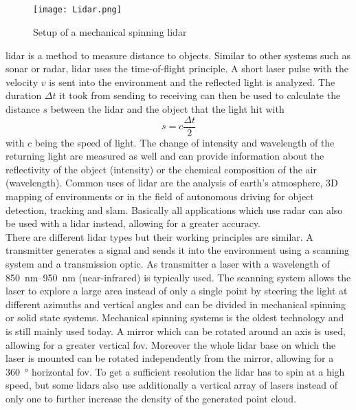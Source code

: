 \subsection{}
\begin{figure}[htb]
	\centering
	\texttt{[image: Lidar.png]}
	\caption{Setup of a mechanical spinning \acrshort{lidar} \cite{Li2020}}
	\label{fig:lidar}
\end{figure}
\gls{lidar} is a method to measure distance to objects.
Similar to other systems such as \gls{sonar} or \gls{radar}, \gls{lidar} uses the time-of-flight principle.
A short laser pulse with the velocity $v$ is sent into the environment and the reflected light is analyzed.
The duration $\Delta t$ it took from sending to receiving can then be used to calculate the distance $s$ between the \gls{lidar} and the object that the light hit with
\begin{equation}
	s = c\frac{\Delta t}{2}
\end{equation}
with $c$ being the speed of light.
The change of intensity and wavelength of the returning light are measured as well and can provide information about the reflectivity of the object (intensity) or the chemical composition of the air (wavelength).
Common uses of \gls{lidar} are the analysis of earth's atmosphere, 3D mapping of environments or in the field of autonomous driving for object detection, tracking and \gls{slam}.
Basically all applications which use \gls{radar} can also be used with a \gls{lidar} instead, allowing for a greater accuracy.\\
There are different \gls{lidar} types but their working principles are similar.
A transmitter generates a signal and sends it into the environment using a scanning system and a transmission optic.
As transmitter a laser with a wavelength of \SIrange{850}{950}{\nano\metre} (near-infrared) is typically used.
The scanning system allows the laser to explore a large area instead of only a single point by steering the light at different azimuths and vertical angles and can be divided in mechanical spinning or solid state systems.
Mechanical spinning systems is the oldest technology and is still mainly used today.
A mirror which can be rotated around an axis is used, allowing for a greater vertical \gls{fov}.
Moreover the whole \gls{lidar} base on which the laser is mounted can be rotated independently from the mirror, allowing for a \SI{360}{\degree} horizontal \gls{fov}.
To get a sufficient resolution the \gls{lidar} has to spin at a high speed, but some \gls{lidar}s also use additionally a vertical array of lasers instead of only one to further increase the density of the generated point cloud.

